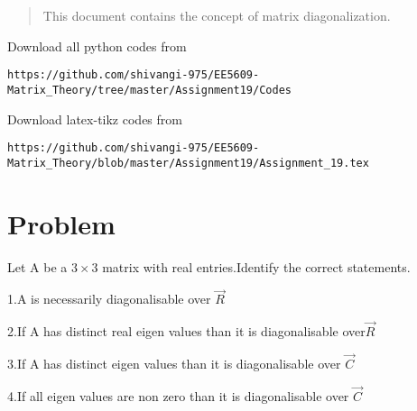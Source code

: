\documentclass[journal,12pt,twocolumn]{IEEEtran}
\begin{document}
%
\vspace{2ex}
\begin{center}
\end{center}
\begin{abstract}
This document contains the concept of matrix  diagonalization.
\end{abstract}
Download all python codes from 
%
\begin{lstlisting}
https://github.com/shivangi-975/EE5609-Matrix_Theory/tree/master/Assignment19/Codes
\end{lstlisting}
%
Download latex-tikz codes from 
%
\begin{lstlisting}
https://github.com/shivangi-975/EE5609-Matrix_Theory/blob/master/Assignment19/Assignment_19.tex
\end{lstlisting}
%
\section{Problem}
Let A be a $3\times 3$  matrix  with real entries.Identify  the correct statements.

1.A  is necessarily diagonalisable over $\vec{R}$

2.If A has distinct real  eigen values than  it is diagonalisable over$\vec{R}$

3.If A has distinct eigen values than  it is diagonalisable over $\vec{C}$

4.If all eigen values are non zero than it is diagonalisable over $\vec{C}$
\end{document}

